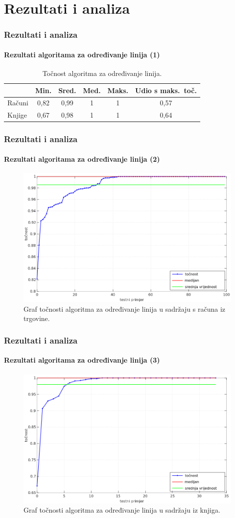 \documentclass{beamer}
\begin{document}
\section{Rezultati i analiza}
\begin{frame}
\frametitle{Rezultati i analiza}
\framesubtitle{Rezultati algoritama za određivanje linija (1)}
\begin{table}[htb]
\caption{Točnost algoritma za određivanje linija.}
\label{tbl:result-01}
\centering
\begin{tabular}{lccccc} \hline
& Min. & Sred. & Med. & Maks. & Udio s maks.\ toč. \\ \hline
Računi & 0,82 & 0,99 & 1 & 1 & 0,57 \\
Knjige & 0,67 & 0,98 & 1 & 1 & 0,64 \\ \hline
\end{tabular}
\end{table}
\end{frame}
\begin{frame}
\frametitle{Rezultati i analiza}
\framesubtitle{Rezultati algoritama za određivanje linija (2)}
\begin{figure}[htb]
    \centering
    \includegraphics[width=.8\textwidth]{images/result-01.png}
    \caption{Graf točnosti algoritma za određivanje linija u sadržaju s računa
    iz trgovine.
    }
    \label{fig:result-01}
\end{figure}
\end{frame}
\begin{frame}
\frametitle{Rezultati i analiza}
\framesubtitle{Rezultati algoritama za određivanje linija (3)}
\begin{figure}[htb]
    \centering
    \includegraphics[width=.8\textwidth]{images/result-02.png}
    \caption{Graf točnosti algoritma za određivanje linija u sadržaju iz knjiga.}
    \label{fig:result-02}
\end{figure}
\end{frame}
\end{document}
